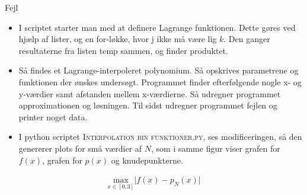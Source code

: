 
\begin{frame}{Fejl}
    \begin{itemize}
        \item I scriptet starter man med at definere Lagrange funktionen. 
        Dette gøres ved hjælp af lister, og en for-løkke, hvor j ikke må være lig $k$. 
        Den ganger resultaterne fra listen temp sammen, og finder produktet.
    
        \item Så findes et Lagrange-interpoleret polynomium. 
        Så opskrives parametrene og funktionen der ønskes undersøgt. 
        Programmet finder efterfølgende nogle x- og y-værdier samt afstanden mellem x-værdierne. 
        Så udregner programmet approximationen og løsningen. 
        Til sidst udregner programmet fejlen og printer noget data. 
    
        \item I python scriptet \textsc{Interpolation bin funktioner.py}, ses modificeringen, så den genererer plots for små værdier af $N$, som i samme figur viser grafen for $f(x)$, grafen for $p(x)$ og knudepunkterne. 
    \end{itemize}
    \begin{align*}
    \underset{x \in \left [0,3 \right ]}{\text{max}} \lvert f(x)-p_N(x) \rvert
    \end{align*}
\end{frame}

